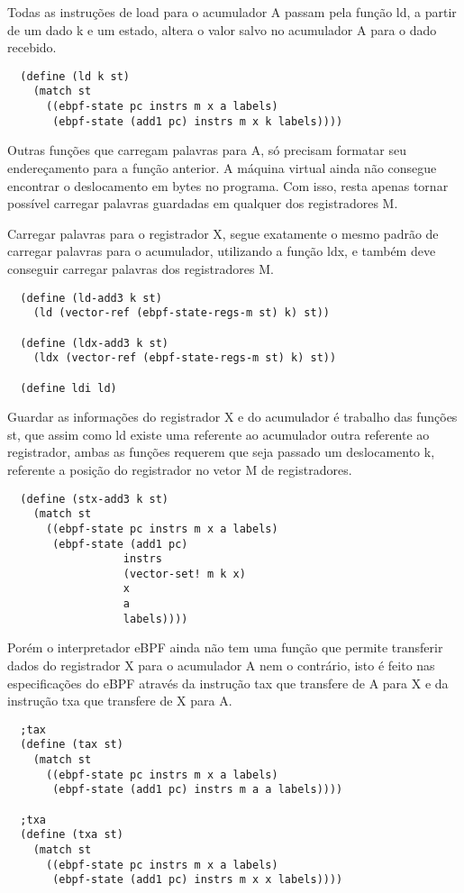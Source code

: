 \documentclass[paper=a4, fontsize=12pt]{article}
\theoremstyle{definition}
\begin{document}
Todas as instruções de load para o acumulador A passam pela função ld, a partir de um dado k e um
estado, altera o valor salvo no acumulador A para o dado recebido.

\begin{lstlisting}
  (define (ld k st)
    (match st
      ((ebpf-state pc instrs m x a labels)
       (ebpf-state (add1 pc) instrs m x k labels))))
\end{lstlisting}

Outras funções que carregam palavras para A, só precisam formatar seu endereçamento para a função
anterior. A máquina virtual ainda não consegue encontrar o deslocamento em bytes no programa.
Com isso, resta apenas tornar possível carregar palavras guardadas em qualquer dos registradores M.

Carregar palavras para o registrador X, segue exatamente o mesmo padrão de carregar palavras para
o acumulador, utilizando a função ldx, e também deve conseguir carregar palavras dos registradores M.

\begin{lstlisting}
  (define (ld-add3 k st)
    (ld (vector-ref (ebpf-state-regs-m st) k) st))

  (define (ldx-add3 k st)
    (ldx (vector-ref (ebpf-state-regs-m st) k) st))

  (define ldi ld)
\end{lstlisting}

Guardar as informações do registrador X e do acumulador é trabalho das funções st, que assim como ld
existe uma referente ao acumulador outra referente ao registrador, ambas as funções requerem que seja
passado um deslocamento k, referente a posição do registrador no vetor M de registradores.

\begin{lstlisting}
  (define (stx-add3 k st)
    (match st
      ((ebpf-state pc instrs m x a labels)
       (ebpf-state (add1 pc)
                  instrs
                  (vector-set! m k x)
                  x
                  a
                  labels))))
\end{lstlisting}

Porém o interpretador eBPF ainda não tem uma função que permite transferir dados do registrador X para o
acumulador A nem o contrário, isto é feito nas especificações do eBPF através da instrução tax que transfere
de A para X e da instrução txa que transfere de X para A.

\begin{lstlisting}
  ;tax
  (define (tax st)
    (match st
      ((ebpf-state pc instrs m x a labels)
       (ebpf-state (add1 pc) instrs m a a labels))))
  
  ;txa
  (define (txa st)
    (match st
      ((ebpf-state pc instrs m x a labels)
       (ebpf-state (add1 pc) instrs m x x labels))))  
\end{lstlisting}
\end{document}
